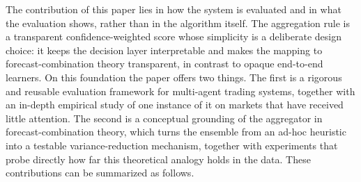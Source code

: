 \documentclass{ieeeaccess}
\begin{document}
The contribution of this paper lies in how the system is evaluated and in what the evaluation shows, rather than in the algorithm itself. The aggregation rule is a transparent confidence-weighted score whose simplicity is a deliberate design choice: it keeps the decision layer interpretable and makes the mapping to forecast-combination theory transparent, in contrast to opaque end-to-end learners. On this foundation the paper offers two things. The first is a rigorous and reusable evaluation framework for multi-agent trading systems, together with an in-depth empirical study of one instance of it on markets that have received little attention. The second is a conceptual grounding of the aggregator in forecast-combination theory, which turns the ensemble from an ad-hoc heuristic into a testable variance-reduction mechanism, together with experiments that probe directly how far this theoretical analogy holds in the data. These contributions can be summarized as follows.
\end{document}
